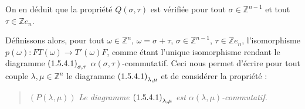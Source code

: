 On en déduit que la propriété $Q(\sigma,\tau)$ est vérifiée pour tout
$\sigma\in\mathbb Z^{n-1}$ et tout $\tau\in\mathbb Z e_n$.

Définissons alors, pour tout $\omega\in\mathbb Z^n$,
$\omega=\sigma+\tau$, $\sigma\in\mathbb Z^{n-1}$,
$\tau\in\mathbb Z e_n$, l'isomorphisme
$p(\omega)\colon FT(\omega)\longrightarrow T'(\omega)F$, comme étant
l'unique isomorphisme rendant le diagramme
$\textup{(1.5.4.1)}_{\sigma,\tau}$
$\alpha(\sigma,\tau)$-commutatif. Ceci nous permet d'écrire pour tout
couple $\lambda,\mu\in\mathbb Z^n$ le diagramme
$\textup{(1.5.4.1)}_{\lambda,\mu}$ et de considérer la propriété :

\begin{quote}
  \noindent\textup{$(P(\lambda,\mu))$}\quad
  \emph{Le diagramme $\textup{(1.5.4.1)}_{\lambda,\mu}$ est
  $\alpha(\lambda,\mu)$-commutatif.}
\end{quote}
